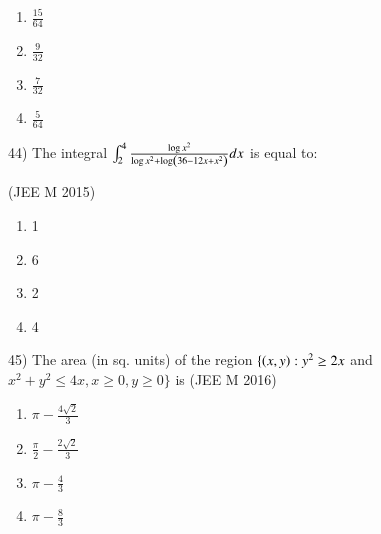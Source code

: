 \documentclass[journal,12pt,twocolumn]{IEEEtran}
\theoremstyle{remark}
\begin{document}
		\begin{multicols}{4}
			\begin{enumerate}[label=(\alph*)]
				\item $\frac{15}{64}$
				\item $\frac{9}{32}$
				\item $\frac{7}{32}$
				\item $\frac{5}{64}$
			\end{enumerate}
		\end{multicols}

44)
	The integral $\int_2^4\frac{\log x^2}{\log x^2 + \log\left(36-12x+x^2\right)}dx$ is equal to:

		\hfill{(JEE M 2015)}

		\begin{multicols}{4}
			\begin{enumerate}[label=(\alph*)]
				\item 1
				\item 6
				\item 2
				\item 4
			\end{enumerate}
		\end{multicols}

45)
	 The area (in sq. units) of the region $\{\left(x,y\right):y^2\geq2x$ and $x^2+y^2\leq4x, x\geq0, y\geq0\}$ is
		\hfill{(JEE M 2016)}

		\begin{multicols}{2}
			\begin{enumerate}[label=(\alph*)]
				\item $\pi-\frac{4\sqrt{2}}{3}$
				\item $\frac{\pi}{2}-\frac{2\sqrt{2}}{3}$
				\item $\pi-\frac{4}{3}$
				\item $\pi-\frac{8}{3}$ 
			\end{enumerate}
		\end{multicols} 
\end{document}
